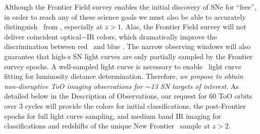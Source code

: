 \documentclass[12pt]{article}
\begin{document}
\smallskip
{} 
Although the Frontier Field survey enables the initial discovery of
SNe for ``free'', in order to reach any of these science goals we must
also be able to accurately distinguish \SNIa\ from \CCSNe, especially
at $z>1$.  Alas, the Frontier Field survey will not deliver coincident
optical$-$IR colors, which dramatically improve the discrimination
between red \SNeIa\ and blue \CCSNe.  The narrow observing windows
will also guarantee that high-z SN light curves are only partially
sampled by the Frontier survey epochs.  A well-sampled light curve is
necessary to enable
\SNIa\ light curve fitting for luminosity distance determination. 
Therefore, {\it we propose to obtain non-disruptive ToO imaging
observations for $\sim$13 SN targets of interest.}  As detailed below
in the Description of Observations, our request for 60 ToO orbits over
3 cycles will provide the colors for initial classifications, the
post-Frontier epochs for full light curve sampling, and medium band IR
imaging for classifications and redshifts of the unique New
Frontier \SNIa\ sample at $z>2$.



%
%
\describeobservations   %


%
%
\specialreq             %


%
%
\coordinatedobs          %


%
%
\duplications           %

\end{document}

